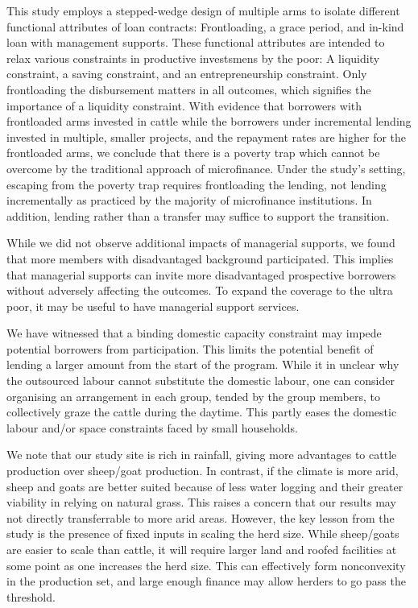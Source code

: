 	This study employs a stepped-wedge design of multiple arms to isolate different functional attributes of loan contracts: Frontloading, a grace period, and in-kind loan with management supports. These functional attributes are intended to relax various constraints in productive investsmens by the poor: A liquidity constraint, a saving constraint, and an entrepreneurship constraint. Only frontloading the disbursement matters in all outcomes, which signifies the importance of a liquidity constraint. With evidence that borrowers with frontloaded arms invested in cattle while the borrowers under incremental lending invested in multiple, smaller projects, and the repayment rates are higher for the frontloaded arms, we conclude that there is a poverty trap which cannot be overcome by the traditional approach of microfinance. Under the study's setting, escaping from the poverty trap requires frontloading the lending, not lending incrementally as practiced by the majority of microfinance institutions. In addition, lending rather than a transfer may suffice to support the transition. 
	
	While we did not observe additional impacts of managerial supports, we found that more members with disadvantaged background participated. This implies that managerial supports can invite more disadvantaged prospective borrowers without adversely affecting the outcomes. To expand the coverage to the ultra poor, it may be useful to have managerial support services.
	
	We have witnessed that a binding domestic capacity constraint may impede potential borrowers from participation. This limits the potential benefit of lending a larger amount from the start of the program. While it in unclear why the outsourced labour cannot substitute the domestic labour, one can consider organising an arrangement in each group, tended by the group members, to collectively graze the cattle during the daytime. This partly eases the domestic labour and/or space constraints faced by small households. 

	We note that our study site is rich in rainfall, giving more advantages to cattle production over sheep/goat production. In contrast, if the climate is more arid, sheep and goats are better suited because of less water logging and their greater viability in relying on natural grass. This raises a concern that our results may not directly transferrable to more arid areas. However, the key lesson from the study is the presence of fixed inputs in scaling the herd size. While sheep/goats are easier to scale than cattle, it will require larger land and roofed facilities at some point as one increases the herd size. This can effectively form nonconvexity in the production set, and large enough finance may allow herders to go pass the threshold. 

